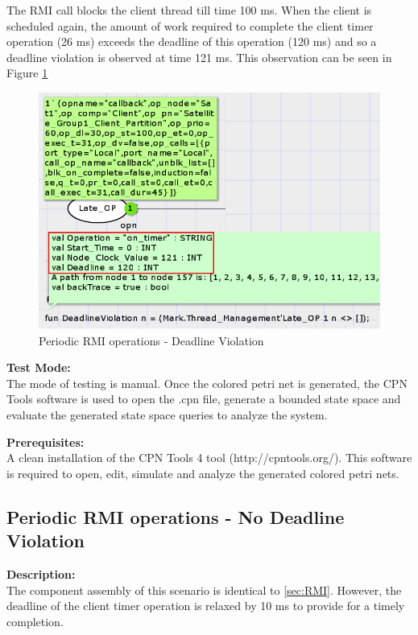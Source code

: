 The RMI call blocks the client thread till time 100 ms. When the client is scheduled again, the amount of work required to complete the client timer operation (26 ms) exceeds the deadline of this operation (120 ms) and so a deadline violation is observed at time 121 ms. This observation can be seen in Figure \ref{fig:Periodic_RMI_DV}

\begin{figure}[htb]
\centering
\includegraphics[scale=0.45]{./figs/CPN_Periodic_RMI_DV.png}
\caption{Periodic RMI operations - Deadline Violation}
\label{fig:Periodic_RMI_DV}
\end{figure}

\noindent\textbf{Test Mode:}\\
The mode of testing is manual. Once the colored petri net is generated, the CPN Tools software is used to open the .cpn file, generate a bounded state space and evaluate the generated state space queries to analyze the system.

\noindent\textbf{Prerequisites:}\\
A clean installation of the CPN Tools 4 tool (http://cpntools.org/). This software is required to open, edit, simulate and analyze the generated colored petri nets. 

\subsection{Periodic RMI operations - No Deadline Violation}

\noindent\textbf{Description:}\\
The component assembly of this scenario is identical to \ref{sec:RMI}. However, the deadline of the client timer operation is relaxed by 10 ms to provide for a timely completion. 

